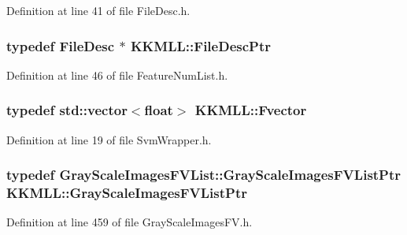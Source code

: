 Definition at line 41 of file File\+Desc.\+h.

\subsubsection[{\texorpdfstring{File\+Desc\+Ptr}{FileDescPtr}}]{\setlength{\rightskip}{0pt plus 5cm}typedef {\bf File\+Desc} $\ast$ {\bf K\+K\+M\+L\+L\+::\+File\+Desc\+Ptr}}\hypertarget{namespace_k_k_m_l_l_aa0d0b6ab4ec18868a399b8455b05d914}{}\label{namespace_k_k_m_l_l_aa0d0b6ab4ec18868a399b8455b05d914}


Definition at line 46 of file Feature\+Num\+List.\+h.

\subsubsection[{\texorpdfstring{Fvector}{Fvector}}]{\setlength{\rightskip}{0pt plus 5cm}typedef std\+::vector$<$float$>$ {\bf K\+K\+M\+L\+L\+::\+Fvector}}\hypertarget{namespace_k_k_m_l_l_a4b8b8beb7bc5b2e041c985d12acec0e7}{}\label{namespace_k_k_m_l_l_a4b8b8beb7bc5b2e041c985d12acec0e7}


Definition at line 19 of file Svm\+Wrapper.\+h.

\subsubsection[{\texorpdfstring{Gray\+Scale\+Images\+F\+V\+List\+Ptr}{GrayScaleImagesFVListPtr}}]{\setlength{\rightskip}{0pt plus 5cm}typedef {\bf Gray\+Scale\+Images\+F\+V\+List\+::\+Gray\+Scale\+Images\+F\+V\+List\+Ptr} {\bf K\+K\+M\+L\+L\+::\+Gray\+Scale\+Images\+F\+V\+List\+Ptr}}\hypertarget{namespace_k_k_m_l_l_a4c2724a20eae2c269d0e1284993d7071}{}\label{namespace_k_k_m_l_l_a4c2724a20eae2c269d0e1284993d7071}


Definition at line 459 of file Gray\+Scale\+Images\+F\+V.\+h.


